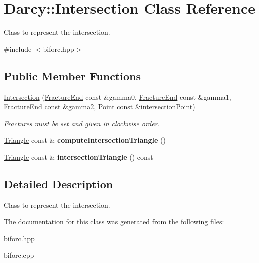 \hypertarget{classDarcy_1_1Intersection}{\section{Darcy\-:\-:Intersection Class Reference}
\label{classDarcy_1_1Intersection}
}


Class to represent the intersection.  




{\ttfamily \#include $<$biforc.\-hpp$>$}

\subsection*{Public Member Functions}
\begin{DoxyCompactItemize}
\item 
\hypertarget{classDarcy_1_1Intersection_adbb6adfb2a801e4af67b2623bcfef604}{\hyperlink{classDarcy_1_1Intersection_adbb6adfb2a801e4af67b2623bcfef604}{Intersection} (\hyperlink{structDarcy_1_1FractureEnd}{Fracture\-End} const \&gamma0, \hyperlink{structDarcy_1_1FractureEnd}{Fracture\-End} const \&gamma1, \hyperlink{structDarcy_1_1FractureEnd}{Fracture\-End} const \&gamma2, \hyperlink{classGeometry_1_1Point}{Point} const \&intersection\-Point)}\label{classDarcy_1_1Intersection_adbb6adfb2a801e4af67b2623bcfef604}

\begin{DoxyCompactList}\small\item\em Fractures must be set and given in clockwise order. \end{DoxyCompactList}\item 
\hypertarget{classDarcy_1_1Intersection_aaa69093af247cba307de82c9c0be7436}{\hyperlink{classGeometry_1_1Triangle}{Triangle} const \& {\bfseries compute\-Intersection\-Triangle} ()}\label{classDarcy_1_1Intersection_aaa69093af247cba307de82c9c0be7436}

\item 
\hypertarget{classDarcy_1_1Intersection_a904459a66077855394c8390865c66911}{\hyperlink{classGeometry_1_1Triangle}{Triangle} const \& {\bfseries intersection\-Triangle} () const }\label{classDarcy_1_1Intersection_a904459a66077855394c8390865c66911}

\end{DoxyCompactItemize}


\subsection{Detailed Description}
Class to represent the intersection. 

The documentation for this class was generated from the following files\-:\begin{DoxyCompactItemize}
\item 
biforc.\-hpp\item 
biforc.\-cpp\end{DoxyCompactItemize}
